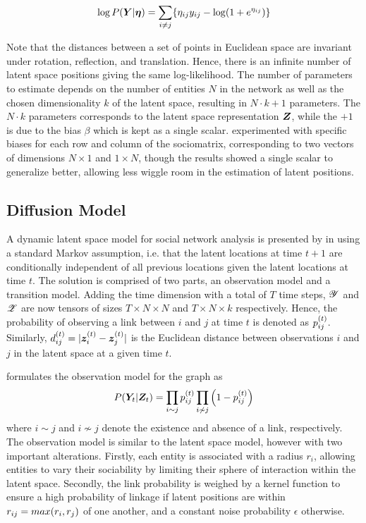     \begin{equation}\label{eq:lsm-log-likelihood}
        \log P(\Y|\bm{\eta}) = \sum_{i\neq j}\{ \sub(\eta)\sub(y) - \log(1+e^{\sub(\eta)}) \}
    \end{equation}
    
    Note that the distances between a set of points in Euclidean space are invariant under rotation, reflection, and translation. Hence, there is an infinite number of latent space positions giving the same log-likelihood. The number of parameters to estimate depends on the number of entities $N$ in the network as well as the chosen dimensionality $k$ of the latent space, resulting in $N \cdot k + 1$ parameters. The $N\cdot k$ parameters corresponds to the latent space representation $\bm{Z}$, while the $+1$ is due to the bias $\beta$ which is kept as a single scalar. \citeauthor{jacobsen2018a} \cite{jacobsen2018a} experimented with specific biases for each row and column of the sociomatrix, corresponding to two vectors of dimensions $N\times 1$ and $1\times N$, though the results showed a single scalar to generalize better, allowing less wiggle room in the estimation of latent positions.
    
\subsection{Diffusion Model}
    
    A dynamic latent space model for social network analysis is presented by \citeauthor{sarkar2005dynamic} in \cite{sarkar2005dynamic} using a standard Markov assumption, i.e. that the latent locations at time $t+1$ are conditionally independent of all previous locations given the latent locations at time $t$. The solution is comprised of two parts, an observation model and a transition model.  Adding the time dimension with a total of $T$ time steps, $\bm{\mathscr{Y}}$ and $\bm{\mathscr{Z}}$ are now tensors of sizes $T\times N\times N$ and $T\times N\times k$ respectively. Hence, the probability of observing a link between $i$ and $j$ at time $t$ is denoted as $\sub(p)^\t$. Similarly, $\sub(d)^\t = |\z_i^\t-\z_j^\t|$ is the Euclidean distance between observations $i$ and $j$ in the latent space at a given time $t$.%
    
    \citeauthor*{sarkar2005dynamic} formulates the observation model for the graph as
    \begin{equation}\label{eq:dsnl-obsmodel}
        P(\Y_t|\Z_t) = \prod_{i\sim j} \sub(p)^\t \prod_{i\not\sim j} \left(1-\sub(p)^\t\right)
    \end{equation}
    where $i\sim j$ and $i\not\sim j$ denote the existence and absence of a link, respectively.
    The observation model is similar to the latent space model, however with two important alterations. Firstly, each entity is associated with a radius $r_i$, allowing entities to vary their sociability by limiting their sphere of interaction within the latent space.
    Secondly, the link probability is weighed by a kernel function to ensure a high probability of linkage if latent positions are within $\sub(r)=max(r_i,r_j)$ of one another, and a constant noise probability $\epsilon$ otherwise.
    
